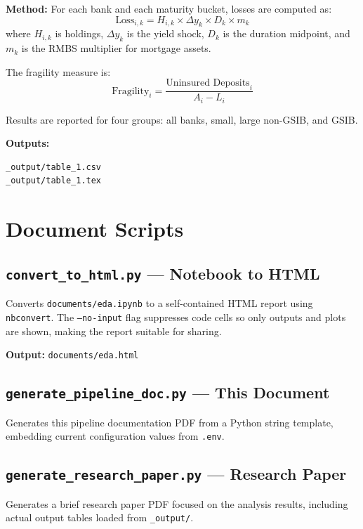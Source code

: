 \documentclass[12pt, a4paper]{article}
\begin{document}
\textbf{Method:} For each bank and each maturity bucket, losses are computed as:
\[
    \text{Loss}_{i,k} = H_{i,k} \times \Delta y_k \times D_k \times m_k
\]
where $H_{i,k}$ is holdings, $\Delta y_k$ is the yield shock, $D_k$ is the
duration midpoint, and $m_k$ is the RMBS multiplier for mortgage assets.

The fragility measure is:
\[
    \text{Fragility}_i = \frac{\text{Uninsured Deposits}_i}{A_i - L_i}
\]

Results are reported for four groups: all banks, small, large non-GSIB, and GSIB.

\textbf{Outputs:}
\begin{lstlisting}
_output/table_1.csv
_output/table_1.tex
\end{lstlisting}

\section{Document Scripts}

\subsection{\texttt{convert\_to\_html.py} --- Notebook to HTML}

Converts \texttt{documents/eda.ipynb} to a self-contained HTML report using
\texttt{nbconvert}. The \texttt{--no-input} flag suppresses code cells so
only outputs and plots are shown, making the report suitable for sharing.

\textbf{Output:} \texttt{documents/eda.html}

\subsection{\texttt{generate\_pipeline\_doc.py} --- This Document}

Generates this pipeline documentation PDF from a Python string template,
embedding current configuration values from \texttt{.env}.

\subsection{\texttt{generate\_research\_paper.py} --- Research Paper}

Generates a brief research paper PDF focused on the analysis results,
including actual output tables loaded from \texttt{\_output/}.
\end{document}
